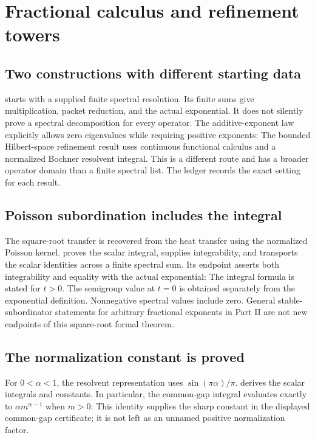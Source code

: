 \clearpage\section{Fractional calculus and refinement towers}
\label{sec:fractional}
\subsection{Two constructions with different starting data}
 starts with a supplied finite spectral resolution. Its finite sums give multiplication, packet reduction, and the actual exponential. It does not silently prove a spectral decomposition for every operator. The additive-exponent law explicitly allows zero eigenvalues while requiring positive exponents:
The bounded Hilbert-space refinement result uses continuous functional calculus and a normalized Bochner resolvent integral. This is a different route and has a broader operator domain than a finite spectral list. The ledger records the exact setting for each result.

\subsection{Poisson subordination includes the integral}
The square-root transfer is recovered from the heat transfer using the normalized Poisson kernel.  proves the scalar integral,  supplies integrability, and  transports the scalar identities across a finite spectral sum. Its endpoint asserts both integrability and equality with the actual exponential:
The integral formula is stated for $t>0$. The semigroup value at $t=0$ is obtained separately from the exponential definition. Nonnegative spectral values include zero. General stable-subordinator statements for arbitrary fractional exponents in Part II are not new endpoints of this square-root formal theorem.

\subsection{The normalization constant is proved}
For $0<\alpha<1$, the resolvent representation uses $\sin(\pi\alpha)/\pi$.  derives the scalar integrals and constants. In particular, the common-gap integral evaluates exactly to $\alpha m^{\alpha-1}$ when $m>0$:
This identity supplies the sharp constant in the displayed common-gap certificate; it is not left as an unnamed positive normalization factor.


